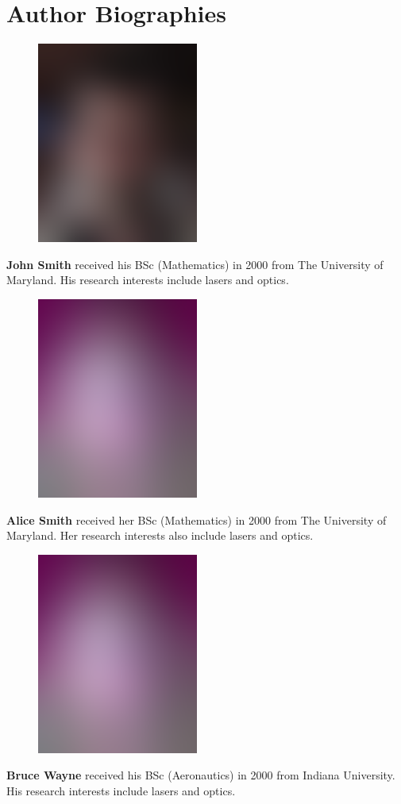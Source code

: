 \documentclass[9pt,twocolumn,twoside]{styles/osajnl}
\begin{document}
\section*{Author Biographies}
\begingroup
\setlength\intextsep{0pt}
\begin{minipage}[t][3.2cm][t]{1.0\columnwidth} %
  \begin{figure}
    \includegraphics[width=0.25\columnwidth]{images/john_smith.eps}
  \end{figure}
  \noindent
  {\bfseries John Smith} received his BSc (Mathematics) in 2000 from
  The University of Maryland. His research interests include lasers
  and optics. 
\end{minipage}
\begin{minipage}[t][3.2cm][t]{1.0\columnwidth} %
  \begin{figure}
    \includegraphics[width=0.25\columnwidth]{images/alice_smith.eps}
  \end{figure}
  \noindent
  {\bfseries Alice Smith} received her BSc (Mathematics) in 2000 from
  The University of Maryland. Her research interests also include
  lasers and optics. 
\end{minipage}
\begin{minipage}[t][3.2cm][t]{1.0\columnwidth} %
  \begin{figure}
    \includegraphics[width=0.25\columnwidth]{images/alice_smith.eps}
  \end{figure}
  \noindent
  {\bfseries Bruce Wayne} received his BSc (Aeronautics) in 2000 from
  Indiana University. His research interests include lasers and optics.
\end{minipage}
\endgroup
\end{document}
